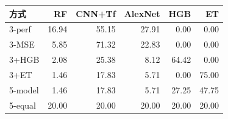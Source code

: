 \begin{tabular}{lrrrrr}
\toprule
方式 & RF & CNN+Tf & AlexNet & HGB & ET \\
\midrule
3-perf & 16.94 & 55.15 & 27.91 & 0.00 & 0.00 \\
3-MSE & 5.85 & 71.32 & 22.83 & 0.00 & 0.00 \\
3+HGB & 2.08 & 25.38 & 8.12 & 64.42 & 0.00 \\
3+ET & 1.46 & 17.83 & 5.71 & 0.00 & 75.00 \\
5-model & 1.46 & 17.83 & 5.71 & 27.25 & 47.75 \\
5-equal & 20.00 & 20.00 & 20.00 & 20.00 & 20.00 \\
\bottomrule
\end{tabular}
